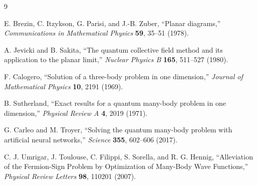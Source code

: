 \documentclass[11pt]{article}
\begin{document}
\begin{thebibliography}{9}

E. Brezin, C. Itzykson, G. Parisi, and J.-B. Zuber,
``Planar diagrams,''
\emph{Communications in Mathematical Physics} \textbf{59}, 35--51 (1978).

A. Jevicki and B. Sakita,
``The quantum collective field method and its application to the planar limit,''
\emph{Nuclear Physics B} \textbf{165}, 511--527 (1980).

F. Calogero,
``Solution of a three-body problem in one dimension,''
\emph{Journal of Mathematical Physics} \textbf{10}, 2191 (1969).

B. Sutherland,
``Exact results for a quantum many-body problem in one dimension,''
\emph{Physical Review A} \textbf{4}, 2019 (1971).

G. Carleo and M. Troyer,
``Solving the quantum many-body problem with artificial neural networks,''
\emph{Science} \textbf{355}, 602--606 (2017).

C. J. Umrigar, J. Toulouse, C. Filippi, S. Sorella, and R. G. Hennig,
``Alleviation of the Fermion-Sign Problem by Optimization of Many-Body Wave Functions,''
\emph{Physical Review Letters} \textbf{98}, 110201 (2007).

\end{thebibliography}
\end{document}
